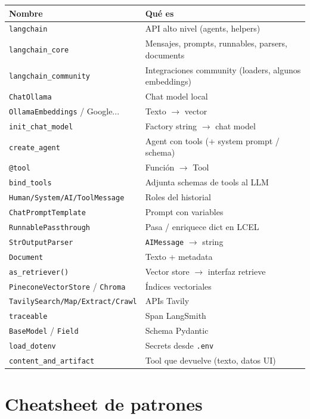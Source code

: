\documentclass[11pt,a4paper]{article}
\begin{document}
\begin{longtable}{@{}p{4.2cm}p{11cm}@{}}
\toprule
\textbf{Nombre} & \textbf{Qué es} \\
\midrule
\endhead
\texttt{langchain} & API alto nivel (agents, helpers) \\
\texttt{langchain\_core} & Mensajes, prompts, runnables, parsers, documents \\
\texttt{langchain\_community} & Integraciones community (loaders, algunos embeddings) \\
\texttt{ChatOllama} & Chat model local \\
\texttt{OllamaEmbeddings} / Google... & Texto $\to$ vector \\
\texttt{init\_chat\_model} & Factory string $\to$ chat model \\
\texttt{create\_agent} & Agent con tools (+ system prompt / schema) \\
\texttt{@tool} & Función $\to$ Tool \\
\texttt{bind\_tools} & Adjunta schemas de tools al LLM \\
\texttt{Human/System/AI/ToolMessage} & Roles del historial \\
\texttt{ChatPromptTemplate} & Prompt con variables \\
\texttt{RunnablePassthrough} & Pasa / enriquece dict en LCEL \\
\texttt{StrOutputParser} & \texttt{AIMessage} $\to$ string \\
\texttt{Document} & Texto + metadata \\
\texttt{as\_retriever()} & Vector store $\to$ interfaz retrieve \\
\texttt{PineconeVectorStore} / \texttt{Chroma} & Índices vectoriales \\
\texttt{TavilySearch/Map/Extract/Crawl} & APIs Tavily \\
\texttt{traceable} & Span LangSmith \\
\texttt{BaseModel} / \texttt{Field} & Schema Pydantic \\
\texttt{load\_dotenv} & Secrets desde \texttt{.env} \\
\texttt{content\_and\_artifact} & Tool que devuelve (texto, datos UI) \\
\bottomrule
\end{longtable}

\section{Cheatsheet de patrones}
\end{document}
